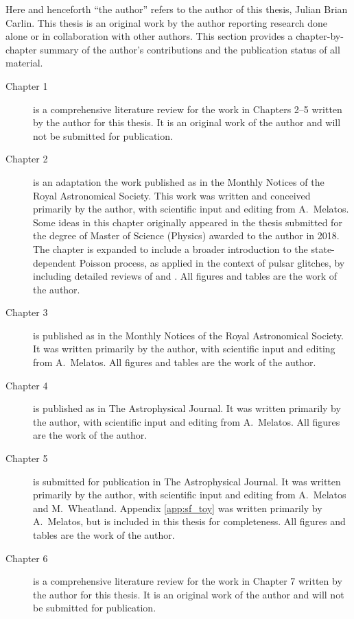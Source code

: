 Here and henceforth ``the author'' refers to the author of this thesis, Julian Brian Carlin. This thesis is an original work by the author reporting research done alone or in collaboration with other authors. 
This section provides a chapter-by-chapter summary of the author's contributions and the publication status of all material.

\begin{description}
  \item[Chapter 1] is a comprehensive literature review for the work in Chapters 2--5 written by the author for this thesis. It is an original work of the author and will not be submitted for publication.
  \item[Chapter 2] is an adaptation the work published as \citet{Carlin2019ac} in the Monthly Notices of the Royal Astronomical Society. This work was written and conceived primarily by the author, with scientific input and editing from A.~Melatos. Some ideas in this chapter originally appeared in the thesis submitted for the degree of Master of Science (Physics) awarded to the author in 2018. The chapter is expanded to include a broader introduction to the state-dependent Poisson process, as applied in the context of pulsar glitches, by including detailed reviews of \citet{Fulgenzi2017} and \citet{Carlin2019quasi}. All figures and tables are the work of the author.
  \item[Chapter 3] is published as \citet{Carlin2020bsa} in the Monthly Notices of the Royal Astronomical Society. It was written primarily by the author, with scientific input and editing from A.~Melatos. All figures and tables are the work of the author.
  \item[Chapter 4] is published as \citet{Carlin2021endog} in The Astrophysical Journal. It was written primarily by the author, with scientific input and editing from A.~Melatos. All figures are the work of the author.
  \item[Chapter 5] is submitted for publication in The Astrophysical Journal. It was written primarily by the author, with scientific input and editing from A.~Melatos and M.~Wheatland. Appendix \ref{app:sf_toy} was written primarily by A.~Melatos, but is included in this thesis for completeness. All figures and tables are the work of the author. 
  \item[Chapter 6] is a comprehensive literature review for the work in Chapter 7 written by the author for this thesis. It is an original work of the author and will not be submitted for publication. 

\end{description}
